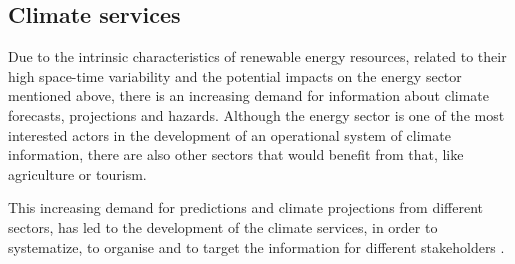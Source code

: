 




\subsection{Climate services}


Due to the intrinsic characteristics of renewable energy resources, related to their high space-time variability and the potential impacts on the energy sector mentioned above, there is an increasing demand for information about climate forecasts, projections and hazards. Although the energy sector is one of the most interested actors in the development of an operational system of climate information, there are also other sectors that would benefit from that, like agriculture or tourism.  
  
This increasing demand for predictions and climate projections from different sectors, has led to the development of the  climate services, in order to systematize, to organise and to target the information for different stakeholders \cite*{Troccoli2018}.


